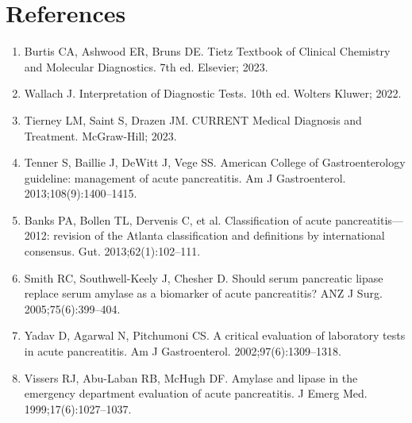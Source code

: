 \section*{References}
\begin{enumerate}
  \item Burtis CA, Ashwood ER, Bruns DE. Tietz Textbook of Clinical Chemistry and Molecular Diagnostics. 7th ed. Elsevier; 2023.
  \item Wallach J. Interpretation of Diagnostic Tests. 10th ed. Wolters Kluwer; 2022.
  \item Tierney LM, Saint S, Drazen JM. CURRENT Medical Diagnosis and Treatment. McGraw-Hill; 2023.
  \item Tenner S, Baillie J, DeWitt J, Vege SS. American College of Gastroenterology guideline: management of acute pancreatitis. Am J Gastroenterol. 2013;108(9):1400--1415.
  \item Banks PA, Bollen TL, Dervenis C, et al. Classification of acute pancreatitis---2012: revision of the Atlanta classification and definitions by international consensus. Gut. 2013;62(1):102--111.
  \item Smith RC, Southwell-Keely J, Chesher D. Should serum pancreatic lipase replace serum amylase as a biomarker of acute pancreatitis? ANZ J Surg. 2005;75(6):399--404.
  \item Yadav D, Agarwal N, Pitchumoni CS. A critical evaluation of laboratory tests in acute pancreatitis. Am J Gastroenterol. 2002;97(6):1309--1318.
  \item Vissers RJ, Abu-Laban RB, McHugh DF. Amylase and lipase in the emergency department evaluation of acute pancreatitis. J Emerg Med. 1999;17(6):1027--1037.
\end{enumerate}

\clearpage
